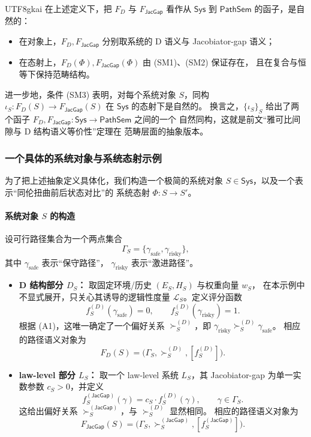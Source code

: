 \documentclass[12pt]{article}
\newcommand{\JacGap}{\mathsf{JacGap}}
\begin{document}
\begin{CJK*}{UTF8}{gkai}
在上述定义下，把 $F_D$ 与 $F_{\JacGap}$ 看作从 $\mathsf{Sys}$ 到
$\mathsf{PathSem}$ 的函子，是自然的：
\begin{itemize}
  \item 在对象上，$F_D,F_{\JacGap}$ 分别取系统的 D 语义与 Jacobiator-gap
        语义；
  \item 在态射上，$F_D(\Phi),F_{\JacGap}(\Phi)$ 由 (SM1)、(SM2) 保证存在，
        且在复合与恒等下保持范畴结构。
\end{itemize}

进一步地，条件 (SM3) 表明，对每个系统对象 $S$，同构
$\iota_S:F_D(S)\to F_{\JacGap}(S)$ 在 $\mathsf{Sys}$ 的态射下是自然的。
换言之，$\{\iota_S\}_S$ 给出了两个函子
$F_D,F_{\JacGap}:\mathsf{Sys}\to\mathsf{PathSem}$ 之间的一个
自然同构，这就是前文“雅可比间隙与 D 结构语义等价性”定理在
范畴层面的抽象版本。

\subsubsection*{一个具体的系统对象与系统态射示例}

为了把上述抽象定义具体化，我们构造一个极简的系统对象
$S\in\mathsf{Sys}$，以及一个表示“同伦扭曲前后状态对比”的
系统态射 $\Phi:S\to S'$。

\paragraph{系统对象 $S$ 的构造}

设可行路径集合为一个两点集合
\[
  \Gamma_S=\{\gamma_{\mathrm{safe}},\gamma_{\mathrm{risky}}\},
\]
其中 $\gamma_{\mathrm{safe}}$ 表示“保守路径”，
$\gamma_{\mathrm{risky}}$ 表示“激进路径”。

\begin{itemize}
  \item \textbf{D 结构部分 $D_S$：}
        取固定环境/历史 $(E_S,H_S)$ 与权重向量 $w_S$，
        在本示例中不显式展开，只关心其诱导的逻辑性度量
        $\mathcal{L}_S$。定义评分函数
        \[
          f^{(D)}_S(\gamma_{\mathrm{safe}})=0,
          \qquad
          f^{(D)}_S(\gamma_{\mathrm{risky}})=1.
        \]
        根据 (A1)，这唯一确定了一个偏好关系
        $\succ^{(D)}_S$，即
        $\gamma_{\mathrm{risky}}\succ^{(D)}_S\gamma_{\mathrm{safe}}$。
        相应的路径语义对象为
        \[
          F_D(S)
          =
          \bigl(
            \Gamma_S,\succ^{(D)}_S,[f^{(D)}_S]
          \bigr).
        \]
  \item \textbf{law-level 部分 $L_S$：}
        取一个 law-level 系统 $L_S$，其 Jacobiator-gap
        为单一实数参数 $c_S>0$，并定义
        \[
          f^{(\JacGap)}_S(\gamma)
          =
          c_S\cdot f^{(D)}_S(\gamma),
          \qquad
          \gamma\in\Gamma_S.
        \]
        这给出偏好关系
        $\succ^{(\JacGap)}_S$，与 $\succ^{(D)}_S$ 显然相同。
        相应的路径语义对象为
        \[
          F_{\JacGap}(S)
          =
          \bigl(
            \Gamma_S,\succ^{(\JacGap)}_S,[f^{(\JacGap)}_S]
          \bigr).
        \]
\end{itemize}


\end{CJK*}
\end{document}
